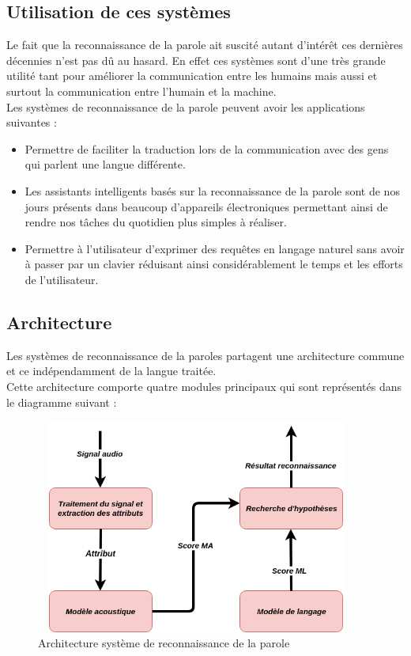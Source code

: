 \subsection{Utilisation de ces systèmes}
Le fait que la reconnaissance de la parole ait suscité autant d'intérêt ces dernières décennies n’est pas dû au hasard. En effet ces systèmes sont d’une très grande utilité tant pour améliorer la communication entre les humains mais aussi et surtout la communication entre l’humain et la machine.\cite{deeplearningapproach}
\\Les systèmes de reconnaissance de la parole peuvent avoir les applications suivantes : 
\begin{itemize}
    \item Permettre de faciliter la traduction lors de la communication avec des gens qui parlent une langue différente.
    \item Les assistants intelligents basés sur la reconnaissance de la parole sont de nos jours présents dans beaucoup d’appareils électroniques permettant ainsi de rendre nos tâches du quotidien plus simples à réaliser.
    \item Permettre à l'utilisateur d'exprimer des requêtes en langage naturel sans avoir à passer par un clavier réduisant ainsi considérablement le temps et les efforts de l'utilisateur.
\end{itemize}

\subsection{Architecture}
Les systèmes de reconnaissance de la paroles partagent une architecture commune et ce indépendamment de la langue traitée.
\\Cette architecture comporte quatre modules principaux qui sont représentés dans le diagramme suivant :
\begin{figure}[H]
    \centering
    \includegraphics[height=200pt,width=300pt]{images/chap1/architecture_asr.png}
    \caption{Architecture système de reconnaissance de la parole\cite{deeplearningapproach}}
\end{figure}

